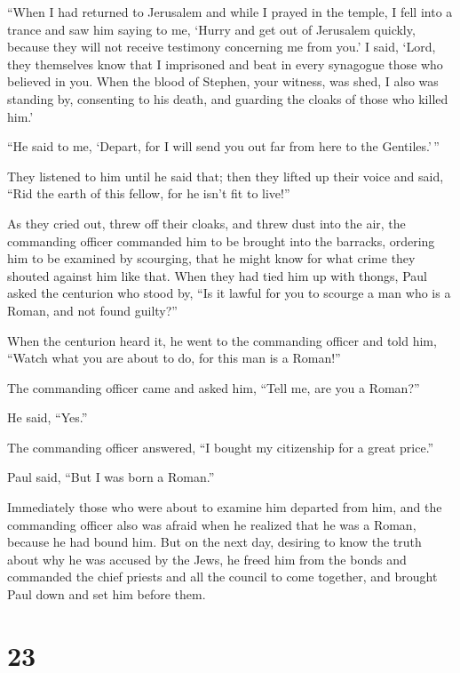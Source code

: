  ``When I had returned to Jerusalem and while I prayed in
the temple, I fell into a trance  and saw him saying to me,
`Hurry and get out of Jerusalem quickly, because they will not receive
testimony concerning me from you.'  I said, `Lord, they
themselves know that I imprisoned and beat in every synagogue those who
believed in you.  When the blood of Stephen, your witness,
was shed, I also was standing by, consenting to his death, and guarding
the cloaks of those who killed him.'

 ``He said to me, `Depart, for I will send you out far from
here to the Gentiles.'\,''

 They listened to him until he said that; then they lifted
up their voice and said, ``Rid the earth of this fellow, for he isn't
fit to live!''

 As they cried out, threw off their cloaks, and threw dust
into the air,  the commanding officer commanded him to be
brought into the barracks, ordering him to be examined by scourging,
that he might know for what crime they shouted against him like that.
 When they had tied him up with thongs, Paul asked the
centurion who stood by, ``Is it lawful for you to scourge a man who is a
Roman, and not found guilty?''

 When the centurion heard it, he went to the commanding
officer and told him, ``Watch what you are about to do, for this man is
a Roman!''

 The commanding officer came and asked him, ``Tell me, are
you a Roman?''

He said, ``Yes.''

 The commanding officer answered, ``I bought my citizenship
for a great price.''

Paul said, ``But I was born a Roman.''

 Immediately those who were about to examine him departed
from him, and the commanding officer also was afraid when he realized
that he was a Roman, because he had bound him.  But on the
next day, desiring to know the truth about why he was accused by the
Jews, he freed him from the bonds and commanded the chief priests and
all the council to come together, and brought Paul down and set him
before them.

\hypertarget{section-22}{%
\section{23}\label{section-22}}

